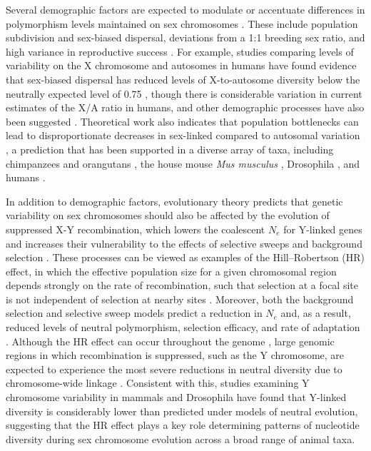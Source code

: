 \documentclass[9pt,twocolumn,twoside]{gsajnl}
\begin{document}
Several demographic factors are expected to modulate or accentuate differences in polymorphism levels maintained on sex chromosomes \citep{ellegren2009}. These include population subdivision and sex-biased dispersal, deviations from a 1:1 breeding sex ratio, and high variance in reproductive success \citep{caballero1995,charlesworth2001,laporte2002,pool2007}. For example, studies comparing levels of variability on the X chromosome and autosomes in humans have found evidence that sex-biased dispersal has reduced levels of X-to-autosome diversity below the neutrally expected level of 0.75 \citep{keinan2009}, though there is considerable variation in current estimates of the X/A ratio in humans, and other demographic processes have also been suggested \citep{hammer2010,bustamante2009}. Theoretical work also indicates that population bottlenecks can lead to disproportionate decreases in sex-linked compared to autosomal variation \citep{pool2007}, a prediction that has been supported in a diverse array of taxa, including chimpanzees and orangutans \citep{kaessmann2001,fischer2006}, the house mouse \textit{Mus musculus} \citep{baines2007}, Drosophila \citep{andolfatto2001}, and humans \citep{keinan2009}.

In addition to demographic factors, evolutionary theory predicts that genetic variability on sex chromosomes should also be affected by the evolution of suppressed X-Y recombination, which lowers the coalescent $N_{e}$ for Y-linked genes and increases their vulnerability to the effects of selective sweeps \citep{smith1974hitch,aquadro1994} and background selection \citep{charlesworth1996background,charlesworth1994effect}. These processes can be viewed as examples of the Hill–Robertson (HR) effect, in which the effective population size for a given chromosomal region depends strongly on the rate of recombination, such that selection at a focal site is not independent of selection at nearby sites \citep{hill1966HReffect}. Moreover, both the background selection and selective sweep models predict a reduction in $N_{e}$ and, as a result, reduced levels of neutral polymorphism, selection efficacy, and rate of adaptation \citep{comeron2008}. Although the HR effect can occur throughout the genome \citep{mcvean2000}, large genomic regions in which recombination is suppressed, such as the Y chromosome, are expected to experience the most severe reductions in neutral diversity due to chromosome-wide linkage \citep{charlesworth1996CB,charlesworth2000degeneration,bachtrog2013NRG}. Consistent with this, studies examining Y chromosome variability in mammals \citep{hellborg2004,Wilsonsayres2014} and Drosophila \citep{mcallister1999,bachtrog2000} have found that Y-linked diversity is considerably lower than predicted under models of neutral evolution, suggesting that the HR effect plays a key role determining patterns of nucleotide diversity during sex chromosome evolution across a broad range of animal taxa.
\end{document}
